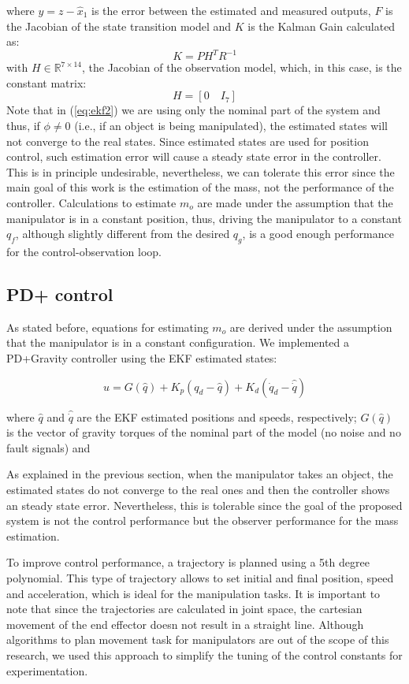 \documentclass[smallextended]{svjour3}       %
\begin{document}
where $y=z - \hat{x}_1$ is the error between the estimated and measured outputs, $F$ is the Jacobian of the state transition model and $K$ is the Kalman Gain calculated as:
\[
K = PH^TR^{-1}
\]
with $H\in\mathbb{R}^{7\times 14}$, the Jacobian of the observation model, which, in this case, is the constant matrix:
\[
H = \left[0\quad I_7\right]
\]
Note that in (\ref{eq:ekf2}) we are using only the nominal part of the system and thus, if $\phi\neq 0$ (i.e., if an object is being manipulated), the estimated states will not converge to the real states. Since estimated states are used for position control, such estimation error will cause a steady state error in the controller. This is in principle undesirable, nevertheless, we can tolerate this error since the main goal of this work is the estimation of the mass, not the performance of the controller. Calculations to estimate $m_o$ are made under the assumption that the manipulator is in a constant position, thus, driving the manipulator to a constant $q_f$, although slightly different from the desired $q_g$, is a good enough performance for the control-observation loop.

\subsection{PD+ control}
As stated before, equations for estimating $m_o$ are derived under the assumption that the manipulator is in a constant configuration. We implemented a PD+Gravity controller using the EKF estimated states:

\begin{equation}
  u = G(\hat{q}) + K_p(q_d - \hat{q}) + K_d(\dot{q}_d - \hat{\dot{q}})
\end{equation}

where $\hat{q}$ and $\hat{\dot{q}}$ are the EKF estimated positions and speeds, respectively; $G(\hat{q})$ is the vector of gravity torques of the nominal part of the model (no noise and no fault signals) and 

As explained in the previous section, when the manipulator takes an object, the estimated states do not converge to the real ones and then the controller shows an steady state error. Nevertheless, this is tolerable since the goal of the proposed system is not the control performance but the observer performance for the mass estimation.

To improve control performance, a trajectory is planned using a 5th degree polynomial. This type of trajectory allows to set initial and final position, speed and acceleration, which is ideal for the manipulation tasks. It is important to note that since the trajectories are calculated in joint space, the cartesian movement of the end effector doesn not result in a straight line. Although algorithms to plan movement task for manipulators are out of the scope of this research, we used this approach to simplify the tuning of the control constants for experimentation.
\end{document}
